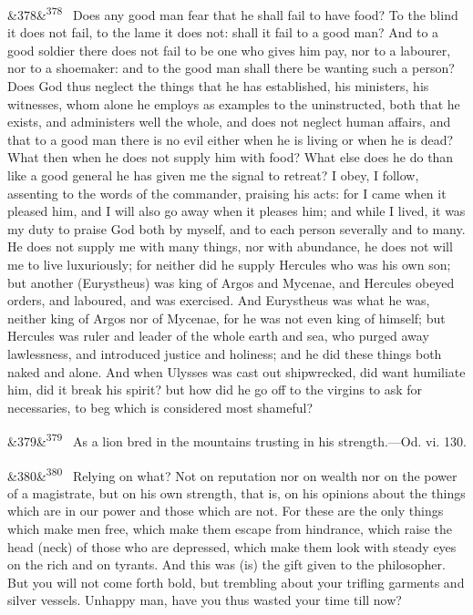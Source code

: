 \documentclass[12pt]{article}
\newcommand{\para}[1][]{\par\noindent\ifx&#1&\else\textsuperscript{\footnotesize #1}~\fi}
\begin{document}
\para[378] Does any good man fear that he shall fail to have food? To the blind it does not fail, to the lame it does not: shall it fail to a good man? And to a good soldier there does not fail to be one who gives him pay, nor to a labourer, nor to a shoemaker: and to the good man shall there be wanting such a person? Does God thus neglect the things that he has established, his ministers, his witnesses, whom alone he employs as examples to the uninstructed, both that he exists, and administers well the whole, and does not neglect human affairs, and that to a good man there is no evil either when he is living or when he is dead? What then when he does not supply him with food? What else does he do than like a good general he has given me the signal to retreat? I obey, I follow, assenting to the words of the commander, praising his acts: for I came when it pleased him, and I will also go away when it pleases him; and while I lived, it was my duty to praise God both by myself, and to each person severally and to many. He does not supply me with many things, nor with abundance, he does not will me to live luxuriously; for neither did he supply Hercules who was his own son; but another (Eurystheus) was king of Argos and Mycenae, and Hercules obeyed orders, and laboured, and was exercised. And Eurystheus was what he was, neither king of Argos nor of Mycenae, for he was not even king of himself; but Hercules was ruler and leader of the whole earth and sea, who purged away lawlessness, and introduced justice and holiness; and he did these things both naked and alone. And when Ulysses was cast out shipwrecked, did want humiliate him, did it break his spirit? but how did he go off to the virgins to ask for necessaries, to beg which is considered most shameful?

\para[379] As a lion bred in the mountains trusting in his strength.—Od. vi. 130.

\para[380] Relying on what? Not on reputation nor on wealth nor on the power of a magistrate, but on his own strength, that is, on his opinions about the things which are in our power and those which are not. For these are the only things which make men free, which make them escape from hindrance, which raise the head (neck) of those who are depressed, which make them look with steady eyes on the rich and on tyrants. And this was (is) the gift given to the philosopher. But you will not come forth bold, but trembling about your trifling garments and silver vessels. Unhappy man, have you thus wasted your time till now?
\end{document}
